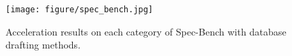 \begin{figure}[t!]

        \centering
        \texttt{[image: figure/spec\_bench.jpg]}
    \caption{\small Acceleration results on each category of Spec-Bench with database drafting methods.}
\label{fig:spec_bench_and_latency_vs_acceptance}
\end{figure}